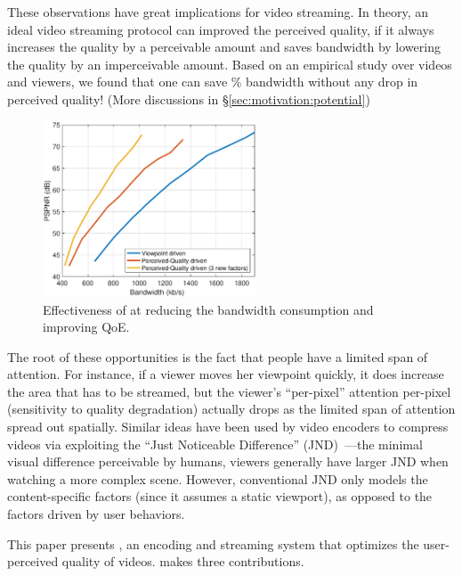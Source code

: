 These observations 
have great implications for \vr video streaming. 
In theory, an ideal video streaming protocol can improved the perceived quality, if it always increases the quality by a perceivable amount and saves bandwidth by lowering the quality by an imperceivable amount. 
Based on an empirical study over \fillme videos and \fillme viewers, we found that one can save \fillme\% bandwidth without any drop in perceived quality! (More discussions in \S\ref{sec:motivation:potential})



\begin{figure}[t!]
  \centering
  \includegraphics[width=2.5in]{images/improvement.eps}
  \caption{Effectiveness of \name at reducing the bandwidth consumption and improving QoE. }
  \label{fig:intro-improvement}
  \end{figure}

The root of these opportunities is the fact that people have a limited span of attention.
For instance, if a viewer moves her viewpoint quickly, it does increase the area that has to be streamed, but the viewer's ``per-pixel'' attention per-pixel (\ie sensitivity to quality degradation) actually drops as the limited span of attention spread out spatially.
Similar ideas have been used by video encoders to compress videos via exploiting the ``Just Noticeable Difference'' (JND)~\cite{??,??,??}---the minimal visual difference perceivable by humans, \eg viewers generally have larger JND when watching a more complex scene. 
However, conventional JND only models the content-specific factors (since it assumes a static viewport), as opposed to the factors driven by user behaviors. 

This paper presents {\em \name}, an encoding and streaming system that optimizes the user-perceived quality of \vr videos. 
\name makes three contributions.

